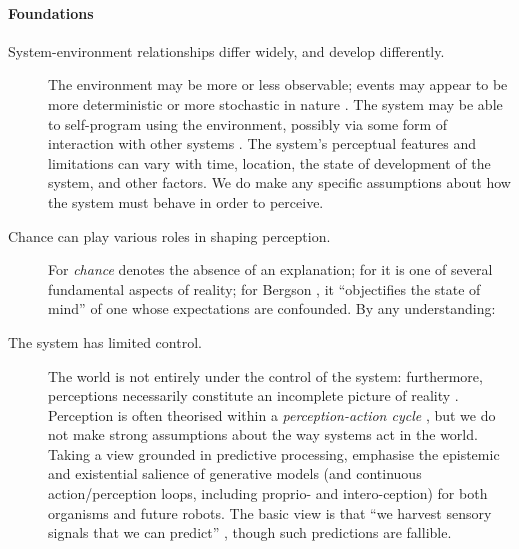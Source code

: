  \paragraph{\textbf{\upshape Foundations}}

 \begin{description}
 \item[System-environment relationships differ widely, and develop
   differently.]  The environment may be more or less observable;
   events may appear to be more deterministic or more stochastic in
   nature \cite[pp.~42--44]{russel2003artificial}. The system may be
   able to self-program using the environment, possibly via some form
   of interaction with other systems
   \cite[esp.~p.~234]{clark1998being}.  The system's perceptual
   features and limitations can vary with time, location, the state of
   development of the system, and other factors.  We do make any
   specific assumptions about how the system must behave in order to
   perceive.
 \item[Chance can play various roles in shaping perception.] For
   \citet[p.~99]{hume1904enquiry} \emph{chance} denotes the absence of
   an explanation; for \citet{peirce1931necessity} it is one of several
   fundamental aspects of reality; for Bergson
   \cite[p.~234]{bergson1983creative}, it ``objectifies the state of
   mind'' of one whose expectations are confounded.  By any
   understanding:
 \item[The system has limited control.] The world is not entirely under
   the control of the system:
   furthermore,
   perceptions necessarily constitute an incomplete picture of reality
   \cite{hoffman2015interface}.
  Perception is often theorised within a \emph{perception-action
  cycle} \cite{cutsuridis2011perception}, but we do not make strong
  assumptions about the way systems act in the world.
 Taking a view grounded in predictive processing, \citet[pp.~2, 17--18]{10.3389/frobt.2018.00021} emphasise 
 the epistemic and existential salience of generative models
 (and continuous action/perception loops, including proprio- and intero-ception)
 for both organisms and future robots.  The basic view is
 that 
 ``we harvest sensory signals that we can predict'' \cite{friston2009free},
 though such predictions are fallible.  
 \end{description}

